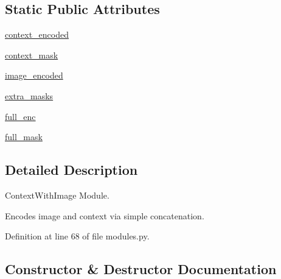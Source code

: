 \subsection*{Static Public Attributes}
\begin{DoxyCompactItemize}
\item 
\hyperlink{classparlai_1_1agents_1_1image__seq2seq_1_1modules_1_1ContextWithImageEncoder_a81a19d768cebc6440bac02d5da5f31b0}{context\+\_\+encoded}
\item 
\hyperlink{classparlai_1_1agents_1_1image__seq2seq_1_1modules_1_1ContextWithImageEncoder_a556a527f3458e63d2705a156f1a5b5c4}{context\+\_\+mask}
\item 
\hyperlink{classparlai_1_1agents_1_1image__seq2seq_1_1modules_1_1ContextWithImageEncoder_a0c1232285cbf2f3dc7eeef2172b61b7e}{image\+\_\+encoded}
\item 
\hyperlink{classparlai_1_1agents_1_1image__seq2seq_1_1modules_1_1ContextWithImageEncoder_a2329b8ef4f01c9d51a81c0e803e7b0af}{extra\+\_\+masks}
\item 
\hyperlink{classparlai_1_1agents_1_1image__seq2seq_1_1modules_1_1ContextWithImageEncoder_ad585a93ac0c508f0153b14d40ee9cd49}{full\+\_\+enc}
\item 
\hyperlink{classparlai_1_1agents_1_1image__seq2seq_1_1modules_1_1ContextWithImageEncoder_ae5cb5ba9bf457b6563571f20245d94dc}{full\+\_\+mask}
\end{DoxyCompactItemize}


\subsection{Detailed Description}
\begin{DoxyVerb}ContextWithImage Module.

Encodes image and context via simple concatenation.
\end{DoxyVerb}
 

Definition at line 68 of file modules.\+py.



\subsection{Constructor \& Destructor Documentation}
\mbox{\label{classparlai_1_1agents_1_1image__seq2seq_1_1modules_1_1ContextWithImageEncoder_a6216c55229638028ec13c3344cc53ca3}} 

